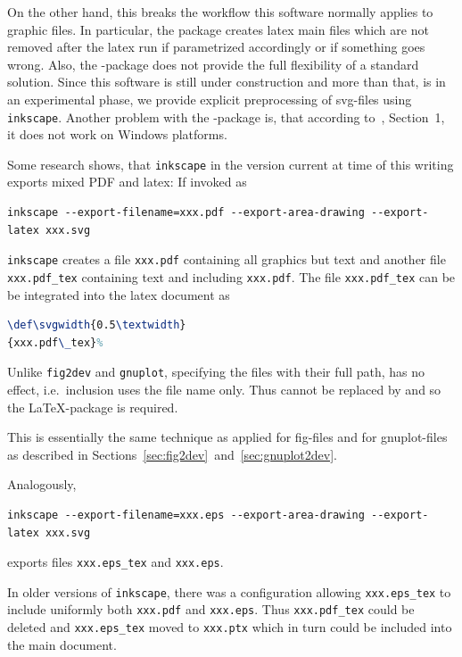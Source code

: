 On the other hand, 
this breaks the workflow this software normally applies to graphic files. 
In particular, the package creates latex main files 
which are not removed after the latex run 
if parametrized accordingly or if something goes wrong. 
Also, the -package does not provide the full flexibility 
of a standard solution. 
Since this software is still under construction 
and more than that, is in an experimental phase, 
we provide explicit preprocessing of svg-files using \texttt{inkscape}. 
Another problem with the -package is, 
that according to~\cite{SvgP}, Section~1, 
it does not work on Windows platforms. 


Some research shows,
that \texttt{inkscape} in the version current at time of this writing
exports mixed PDF and latex: If invoked as 
%
\begin{Verbatim}[fontsize=\footnotesize]
inkscape --export-filename=xxx.pdf --export-area-drawing --export-latex xxx.svg 
\end{Verbatim}
%
\texttt{inkscape} creates a file \texttt{xxx.pdf}
containing all graphics but text and another file \texttt{xxx.pdf\_tex}
containing text and including \texttt{xxx.pdf}.
The file \texttt{xxx.pdf\_tex}
can be be integrated into the latex document as
%
\begin{lstlisting}[language=TeX]
\def\svgwidth{0.5\textwidth}
{xxx.pdf\_tex}%
\end{lstlisting}
%
Unlike \texttt{fig2dev} and \texttt{gnuplot}, 
specifying the files with their full path, 
has no effect, i.e.~inclusion uses the file name only. 
Thus  cannot be replaced by  
and so the \LaTeX-package  is required. 
 

This is essentially the same technique as applied for fig-files 
and for gnuplot-files as described 
in Sections~\ref{sec:fig2dev}~and~\ref{sec:gnuplot2dev}. 

Analogously,
%
\begin{Verbatim}[fontsize=\footnotesize]
inkscape --export-filename=xxx.eps --export-area-drawing --export-latex xxx.svg 
\end{Verbatim}
%
exports files \texttt{xxx.eps\_tex} and \texttt{xxx.eps}.

In older versions of \texttt{inkscape},
there was a configuration allowing \texttt{xxx.eps\_tex}
to include uniformly both \texttt{xxx.pdf} and \texttt{xxx.eps}.
Thus \texttt{xxx.pdf\_tex} could be deleted
and \texttt{xxx.eps\_tex} moved to \texttt{xxx.ptx}
which in turn could be included into the main document.


